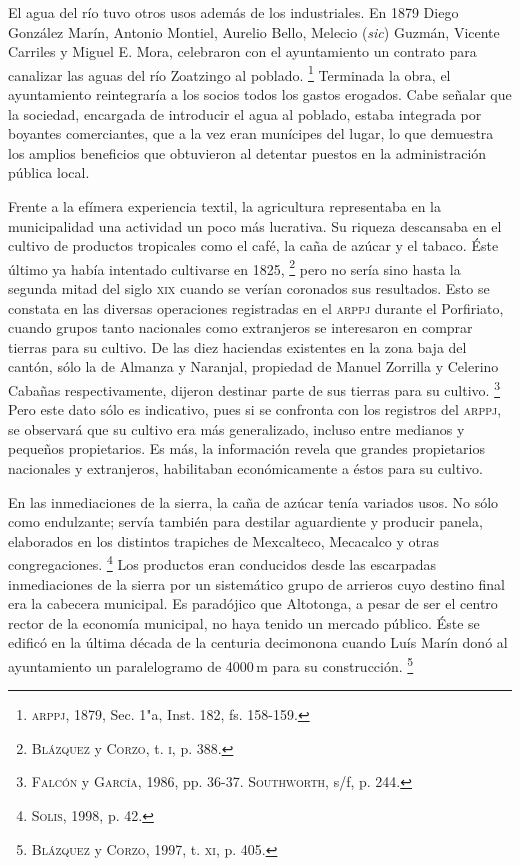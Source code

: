 \documentclass[14pt,twoside,final]{extbook} %
\let\oldfootnote\footnote
\renewcommand\footnote[1]{%
\oldfootnote{\hspace{1mm}#1}}
\begin{document}
El agua del río tuvo otros usos además de los industriales. En 1879 Diego González Marín, Antonio Montiel, Aurelio Bello, Melecio (\emph{sic}) Guzmán, Vicente Carriles y Miguel E. Mora, celebraron con el ayuntamiento un contrato para canalizar las aguas del río Zoatzingo al poblado.\footnote{\textsc{arppj}, 1879, Sec. 1"a, Inst. 182, fs. 158-159.} Terminada la obra, el ayuntamiento reintegraría a los socios todos los gastos erogados. Cabe señalar que la sociedad, encargada de introducir el agua al poblado, estaba integrada por boyantes comerciantes, que a la vez eran munícipes del lugar, lo que demuestra los amplios beneficios que obtuvieron al detentar puestos en la administración pública local.

Frente a la efímera experiencia textil, la agricultura representaba en la municipalidad una actividad un poco más lucrativa. Su riqueza descansaba en el cultivo de productos tropicales como el café, la caña de azúcar y el tabaco. Éste último ya había intentado cultivarse en 1825,\footnote{\textsc{Blázquez} y \textsc{Corzo}, t. \textsc{i}, p. 388.} pero no sería sino hasta la segunda mitad del siglo \textsc{xix} cuando se verían coronados sus resultados. Esto se constata en las diversas operaciones registradas en el \textsc{arppj} durante el Porfiriato, cuando grupos tanto nacionales como extranjeros se interesaron en comprar tierras para su cultivo. De las diez haciendas
existentes en la zona baja del cantón, sólo la de Almanza y Naranjal, propiedad de Manuel Zorrilla y Celerino Cabañas respectivamente, dijeron destinar parte de sus tierras para su cultivo.\footnote{\textsc{Falcón} y \textsc{García}, 1986, pp. 36-37. \textsc{Southworth}, s/f, p. 244.} Pero este dato sólo es indicativo, pues si se confronta con los registros del \textsc{arppj}, se observará que su cultivo era más generalizado, incluso entre medianos y pequeños propietarios. Es más, la información revela que grandes propietarios nacionales y extranjeros, habilitaban económicamente a éstos para su cultivo.

En las inmediaciones de la sierra, la caña de azúcar tenía variados usos. No sólo como endulzante; servía también para destilar aguardiente y producir panela, elaborados en los distintos trapiches de Mexcalteco, Mecacalco y otras congregaciones.\footnote{\textsc{Solis}, 1998, p. 42.} Los productos eran conducidos desde las escarpadas inmediaciones de la sierra por un sistemático grupo de arrieros cuyo destino final era la cabecera municipal. Es paradójico que Altotonga, a pesar de ser el centro rector de la economía municipal, no haya tenido un mercado público. Éste se edificó en la última década de la centuria decimonona cuando Luís Marín donó al ayuntamiento un paralelogramo de 4000\,m para su construcción.\footnote{\textsc{Blázquez} y \textsc{Corzo}, 1997, t. \textsc{xi}, p. 405.}
\end{document}
